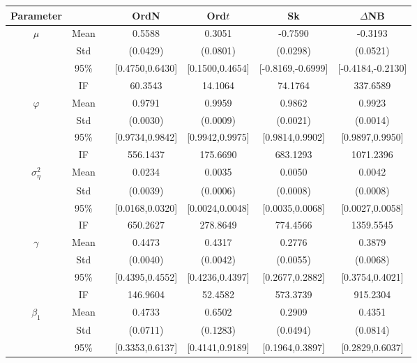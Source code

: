 \begin{table} 
\center 
\begin{footnotesize}
\tabcolsep=0.07cm
\begin{singlespace}
\begin{tabular}{ccc cccc } 
\toprule 
Parameter &&& OrdN  & Ord$t$ & Sk & $\Delta$NB \\ \hline
 $\mu$   & Mean   &  &  0.5588  &  0.3051  &  -0.7590  &  -0.3193  \\  
 & Std   &  &  (0.0429)  &  (0.0801)  &  (0.0298)  &  (0.0521)  \\  
 & 95\%  &  &  [0.4750,0.6430]  &  [0.1500,0.4654]  &  [-0.8169,-0.6999]  &  [-0.4184,-0.2130]  \\  
 & IF  &  &  60.3543  &  14.1064  &  74.1764  &  337.6589  \\ [1.0ex] 
 $\varphi$   & Mean   &  &  0.9791  &  0.9959  &  0.9862  &  0.9923  \\  
 & Std   &  &  (0.0030)  &  (0.0009)  &  (0.0021)  &  (0.0014)  \\  
 & 95\%  &  &  [0.9734,0.9842]  &  [0.9942,0.9975]  &  [0.9814,0.9902]  &  [0.9897,0.9950]  \\  
 & IF  &  &  556.1437  &  175.6690  &  683.1293  &  1071.2396  \\ [1.0ex] 
 $\sigma^2_{\eta}$   & Mean   &  &  0.0234  &  0.0035  &  0.0050  &  0.0042  \\  
 & Std   &  &  (0.0039)  &  (0.0006)  &  (0.0008)  &  (0.0008)  \\  
 & 95\%  &  &  [0.0168,0.0320]  &  [0.0024,0.0048]  &  [0.0035,0.0068]  &  [0.0027,0.0058]  \\  
 & IF  &  &  650.2627  &  278.8649  &  774.4566  &  1359.5545  \\ [1.0ex] 
 $\gamma$   & Mean   &  &  0.4473  &  0.4317  &  0.2776  &  0.3879  \\  
 & Std   &  &  (0.0040)  &  (0.0042)  &  (0.0055)  &  (0.0068)  \\  
 & 95\%  &  &  [0.4395,0.4552]  &  [0.4236,0.4397]  &  [0.2677,0.2882]  &  [0.3754,0.4021]  \\  
 & IF  &  &  146.9604  &  52.4582  &  573.3739  &  915.2304  \\ [1.0ex] 
 $\beta_1$   & Mean   &  &  0.4733  &  0.6502  &  0.2909  &  0.4351  \\  
 & Std   &  &  (0.0711)  &  (0.1283)  &  (0.0494)  &  (0.0814)  \\  
 & 95\%  &  &  [0.3353,0.6137]  &  [0.4141,0.9189]  &  [0.1964,0.3897]  &  [0.2829,0.6037]  \\  

\end{tabular}
\end{singlespace}
\end{footnotesize}
\end{table}

